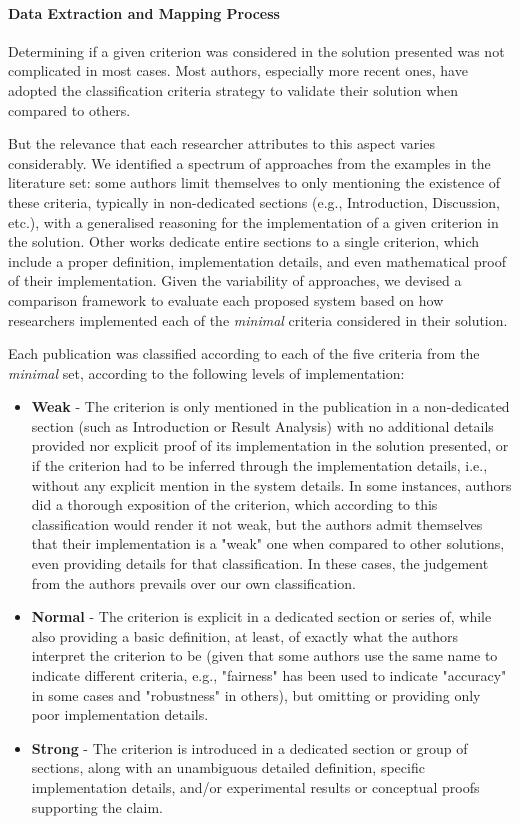 \documentclass[../access.tex]{subfiles}
\begin{document}
    \paragraph{Data Extraction and Mapping Process}
    \label{comparative-framework}
    Determining if a given criterion was considered in the solution presented was not complicated in most cases. Most authors, especially more recent ones, have adopted the classification criteria strategy to validate their solution when compared to others.
    \par
    But the relevance that each researcher attributes to this aspect varies considerably. We identified a spectrum of approaches from the examples in the literature set: some authors limit themselves to only mentioning the existence of these criteria, typically in non-dedicated sections (e.g., Introduction, Discussion, etc.), with a generalised reasoning for the implementation of a given criterion in the solution. Other works dedicate entire sections to a single criterion, which include a proper definition, implementation details, and even mathematical proof of their implementation. Given the variability of approaches, we devised a comparison framework to evaluate each proposed system based on how researchers implemented each of the \textit{minimal} criteria considered in their solution.
    \par
    Each publication was classified according to each of the five criteria from the \textit{minimal} set, according to the following levels of implementation:
    \begin{itemize}
        \item{\textbf{Weak} - The criterion is only mentioned in the publication in a non-dedicated section (such as Introduction or Result Analysis) with no additional details provided nor explicit proof of its implementation in the solution presented, or if the criterion had to be inferred through the implementation details, i.e., without any explicit mention in the system details. In some instances, authors did a thorough exposition of the criterion, which according to this classification would render it not weak, but the authors admit themselves that their implementation is a "weak" one when compared to other solutions, even providing details for that classification. In these cases, the judgement from the authors prevails over our own classification.}

        \item{\textbf{Normal} - The criterion is explicit in a dedicated section or series of, while also providing a basic definition, at least, of exactly what the authors interpret the criterion to be (given that some authors use the same name to indicate different criteria, e.g., "fairness" has been used to indicate "accuracy" in some cases and "robustness" in others), but omitting or providing only poor implementation details.}

        \item{\textbf{Strong} - The criterion is introduced in a dedicated section or group of sections, along with an unambiguous detailed definition, specific implementation details, and/or experimental results or conceptual proofs supporting the claim.}
    \end{itemize}
    
\end{document}
